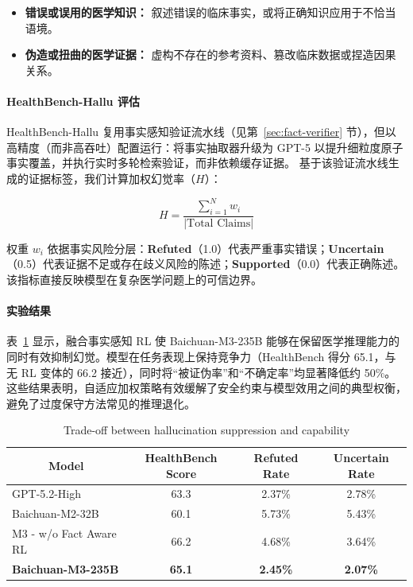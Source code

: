 \begin{itemize}
    \item \textbf{错误或误用的医学知识：} 叙述错误的临床事实，或将正确知识应用于不恰当语境。
    \item \textbf{伪造或扭曲的医学证据：} 虚构不存在的参考资料、篡改临床数据或捏造因果关系。
\end{itemize}


\paragraph{HealthBench-Hallu 评估}
HealthBench-Hallu 复用事实感知验证流水线（见第~\ref{sec:fact-verifier} 节），但以高精度（而非高吞吐）配置运行：将事实抽取器升级为 GPT-5 以提升细粒度原子事实覆盖，并执行实时多轮检索验证，而非依赖缓存证据。
基于该验证流水线生成的证据标签，我们计算加权幻觉率（$H$）：

\begin{equation}
H = \frac{\sum_{i=1}^{N} w_i}{|\text{Total Claims}|}
\end{equation}

权重 $w_i$ 依据事实风险分层：\textbf{Refuted}（1.0）代表严重事实错误；\textbf{Uncertain}（0.5）代表证据不足或存在歧义风险的陈述；\textbf{Supported}（0.0）代表正确陈述。该指标直接反映模型在复杂医学问题上的可信边界。


\paragraph{实验结果}

表~\ref{tab:hallu_vs_cap} 显示，融合事实感知 RL 使 Baichuan-M3-235B 能够在保留医学推理能力的同时有效抑制幻觉。模型在任务表现上保持竞争力（HealthBench 得分 65.1，与无 RL 变体的 66.2 接近），同时将“被证伪率”和“不确定率”均显著降低约 50\%。这些结果表明，自适应加权策略有效缓解了安全约束与模型效用之间的典型权衡，避免了过度保守方法常见的推理退化。

\begin{table}[htbp]
  \centering
  \caption{Trade-off between hallucination suppression and capability}
    \begin{tabular}{lccc}
    \toprule
    \multicolumn{1}{c}{\textbf{Model}} & \textbf{HealthBench Score} & \textbf{Refuted Rate} & \textbf{Uncertain Rate} \\
    \midrule
    GPT-5.2-High & 63.3  & 2.37\% & 2.78\% \\
    Baichuan-M2-32B & 60.1  & 5.73\% & 5.43\% \\
    M3 - w/o Fact Aware RL & 66.2  & 4.68\% & 3.64\% \\
    \textbf{Baichuan-M3-235B} & \textbf{65.1} & \textbf{2.45\%} & \textbf{2.07\%} \\
    \bottomrule
    \end{tabular}%
  \label{tab:hallu_vs_cap}%
\end{table}%

